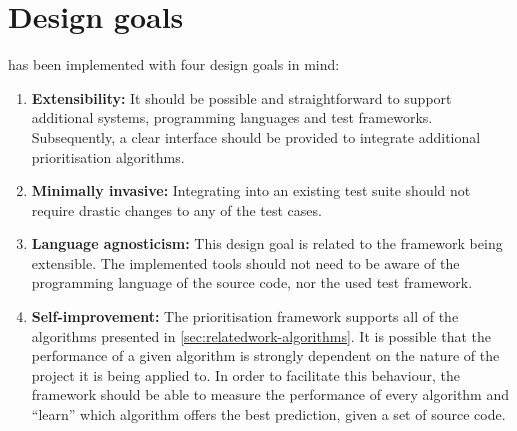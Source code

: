 
\section{Design goals}
\velocity{} has been implemented with four design goals in mind:
\begin{enumerate}
	\item \textbf{Extensibility:} It should be possible and straightforward to support additional \CI{} systems, programming languages and test frameworks. Subsequently, a clear interface should be provided to integrate additional prioritisation algorithms.
	
	\item \textbf{Minimally invasive:} Integrating \velocity{} into an existing test suite should not require drastic changes to any of the test cases.
	
	\item \textbf{Language agnosticism:} This design goal is related to the framework being extensible. The implemented tools should not need to be aware of the programming language of the source code, nor the used test framework.
	
	\item \textbf{Self-improvement:} The prioritisation framework supports all of the algorithms presented in \autoref{sec:relatedwork-algorithms}. It is possible that the performance of a given algorithm is strongly dependent on the nature of the project it is being applied to. In order to facilitate this behaviour, the framework should be able to measure the performance of every algorithm and ``learn'' which algorithm offers the best prediction, given a set of source code.
\end{enumerate}